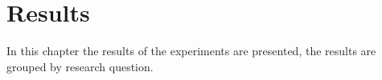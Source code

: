 \chapter{Results}
\label{results}


{}
In this chapter the results of the experiments are presented, the results are grouped by research question.

